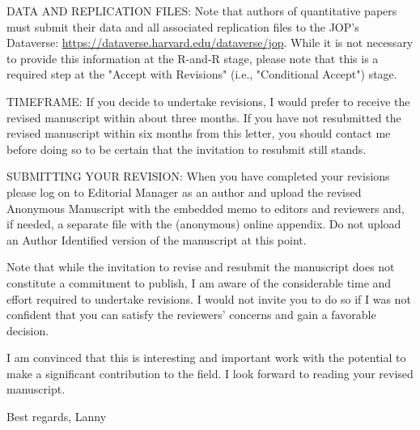 \documentclass[article,letterpaper,times,12pt,listings-bw,microtype]{article}
\begin{document}
DATA AND REPLICATION FILES: Note that authors of quantitative papers must submit their data and all associated replication files to the JOP's Dataverse: \url{https://dataverse.harvard.edu/dataverse/jop}. While it is not necessary to provide this information at the R-and-R stage, please note that this is a required step at the "Accept with Revisions" (i.e., "Conditional Accept") stage.

TIMEFRAME: If you decide to undertake revisions, I would prefer to receive the revised manuscript within about three months. If you have not resubmitted the revised manuscript within six months from this letter, you should contact me before doing so to be certain that the invitation to resubmit still stands.

SUBMITTING YOUR REVISION: When you have completed your revisions please log on to Editorial Manager as an author and upload the revised Anonymous Manuscript with the embedded memo to editors and reviewers and, if needed, a separate file with the (anonymous) online appendix. Do not upload an Author Identified version of the manuscript at this point.

Note that while the invitation to revise and resubmit the manuscript does not constitute a commitment to publish, I am aware of the considerable time and effort required to undertake revisions. I would not invite you to do so if I was not confident that you can satisfy the reviewers' concerns and gain a favorable decision. 

I am convinced that this is interesting and important work with the potential to make a significant contribution to the field. I look forward to reading your revised manuscript.

Best regards,
Lanny
\end{document}
